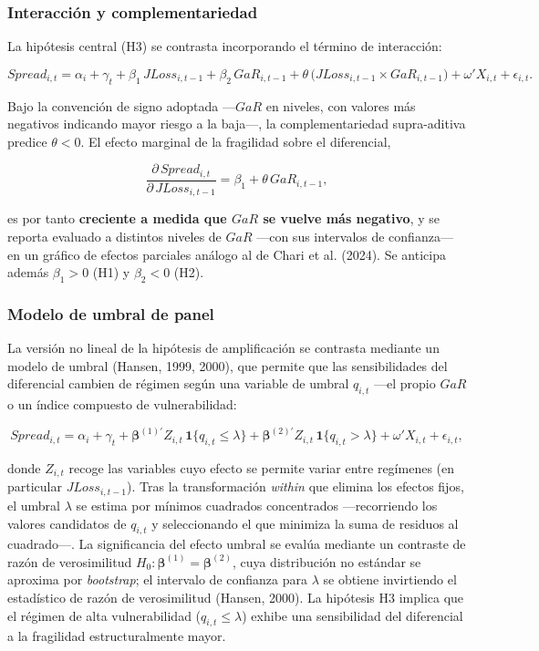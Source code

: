 \documentclass[5p,times,twocolumn,authoryear]{elsarticle}
\begin{document}
\subsubsection{Interacción y complementariedad}

La hipótesis central (H3) se contrasta incorporando el término de interacción:

\[ Spread_{i,t} = \alpha_i + \gamma_t + \beta_1\,JLoss_{i,t-1} + \beta_2\,GaR_{i,t-1} + \theta\,\bigl(JLoss_{i,t-1}\times GaR_{i,t-1}\bigr) + \omega'X_{i,t} + \epsilon_{i,t}. \]

Bajo la convención de signo adoptada —$GaR$ en niveles, con valores más negativos indicando mayor riesgo a la baja—, la complementariedad supra-aditiva predice $\theta < 0$. El efecto marginal de la fragilidad sobre el diferencial,

\[ \frac{\partial\,Spread_{i,t}}{\partial\,JLoss_{i,t-1}} = \beta_1 + \theta\,GaR_{i,t-1}, \]

es por tanto \textbf{creciente a medida que $GaR$ se vuelve más negativo}, y se reporta evaluado a distintos niveles de $GaR$ —con sus intervalos de confianza— en un gráfico de efectos parciales análogo al de Chari et al. (2024). Se anticipa además $\beta_1 > 0$ (H1) y $\beta_2 < 0$ (H2).

\subsubsection{Modelo de umbral de panel}

La versión no lineal de la hipótesis de amplificación se contrasta mediante un modelo de umbral (Hansen, 1999, 2000), que permite que las sensibilidades del diferencial cambien de régimen según una variable de umbral $q_{i,t}$ —el propio $GaR$ o un índice compuesto de vulnerabilidad:

\[ Spread_{i,t} = \alpha_i + \gamma_t + \boldsymbol{\beta}^{(1)'} Z_{i,t}\,\mathbf{1}\{q_{i,t}\le\lambda\} + \boldsymbol{\beta}^{(2)'} Z_{i,t}\,\mathbf{1}\{q_{i,t}>\lambda\} + \omega'X_{i,t} + \epsilon_{i,t}, \]

donde $Z_{i,t}$ recoge las variables cuyo efecto se permite variar entre regímenes (en particular $JLoss_{i,t-1}$). Tras la transformación \textit{within} que elimina los efectos fijos, el umbral $\lambda$ se estima por mínimos cuadrados concentrados —recorriendo los valores candidatos de $q_{i,t}$ y seleccionando el que minimiza la suma de residuos al cuadrado—. La significancia del efecto umbral se evalúa mediante un contraste de razón de verosimilitud $H_0:\boldsymbol{\beta}^{(1)} = \boldsymbol{\beta}^{(2)}$, cuya distribución no estándar se aproxima por \textit{bootstrap}; el intervalo de confianza para $\lambda$ se obtiene invirtiendo el estadístico de razón de verosimilitud (Hansen, 2000). La hipótesis H3 implica que el régimen de alta vulnerabilidad ($q_{i,t}\le\lambda$) exhibe una sensibilidad del diferencial a la fragilidad estructuralmente mayor.
\end{document}
